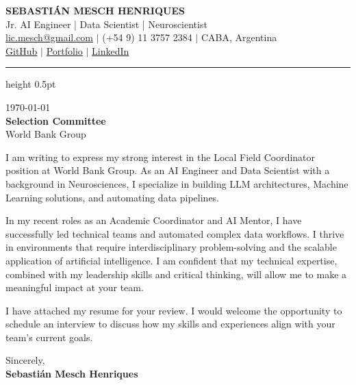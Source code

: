 \documentclass[11pt,a4paper]{article}
\begin{document}
\begin{center}
{\bfseries\LARGE \uppercase{Sebastián Mesch Henriques}}\\[3pt]
{\color{accent}\large Jr. AI Engineer | Data Scientist | Neuroscientist }\\[6pt]

{\normalsize
\href{mailto:lic.mesch@gmail.com}{lic.mesch@gmail.com} $|$
(+54 9) 11 3757 2384 $|$
CABA, Argentina\\
\href{ https://github.com/SMESCH1 }{GitHub} $|$
\href{ https://smesch1.github.io/ }{Portfolio} $|$
\href{ https://linkedin.com/in/sebastian-mesch-henriques }{LinkedIn}
}
\end{center}

{\color{accent}\hrule height 0.5pt}\vspace{24pt}

\begin{flushleft}
\today\\[1em]
\textbf{Selection Committee}\\
World Bank Group
\end{flushleft}

\vspace{1em}


I am writing to express my strong interest in the Local Field Coordinator position at World Bank Group. As an AI Engineer and Data Scientist with a background in Neurosciences, I specialize in building LLM architectures, Machine Learning solutions, and automating data pipelines.

In my recent roles as an Academic Coordinator and AI Mentor, I have successfully led technical teams and automated complex data workflows. I thrive in environments that require interdisciplinary problem-solving and the scalable application of artificial intelligence. I am confident that my technical expertise, combined with my leadership skills and critical thinking, will allow me to make a meaningful impact at your team.

I have attached my resume for your review. I would welcome the opportunity to schedule an interview to discuss how my skills and experiences align with your team's current goals.


\vspace{2em}

\begin{flushleft}
Sincerely,\\[1em]
\textbf{Sebastián Mesch Henriques}
\end{flushleft}
\end{document}
